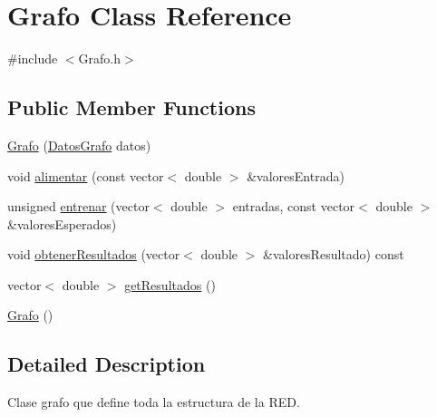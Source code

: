 \hypertarget{classGrafo}{\section{Grafo Class Reference}
\label{classGrafo}
}


{\ttfamily \#include $<$Grafo.\-h$>$}

\subsection*{Public Member Functions}
\begin{DoxyCompactItemize}
\item 
\hyperlink{classGrafo_a1876ac5c509e53a40eccbeaeaa65666e}{Grafo} (\hyperlink{classDatosGrafo}{Datos\-Grafo} datos)
\item 
void \hyperlink{classGrafo_af35326ac9f80c6ca763a1c3b0ef15b60}{alimentar} (const vector$<$ double $>$ \&valores\-Entrada)
\item 
unsigned \hyperlink{classGrafo_af2bc519db98b68230c525db3331c1c66}{entrenar} (vector$<$ double $>$ entradas, const vector$<$ double $>$ \&valores\-Esperados)
\item 
void \hyperlink{classGrafo_a158dbc3b6695be5e34f5e82ad7670632}{obtener\-Resultados} (vector$<$ double $>$ \&valores\-Resultado) const 
\item 
vector$<$ double $>$ \hyperlink{classGrafo_a985b9195224b1d3d9132d55c5db08cb9}{get\-Resultados} ()
\item 
\hyperlink{classGrafo_ab810bbe26a98e9af6661ccddff66b03b}{Grafo} ()
\end{DoxyCompactItemize}


\subsection{Detailed Description}
Clase grafo que define toda la estructura de la R\-E\-D. 

